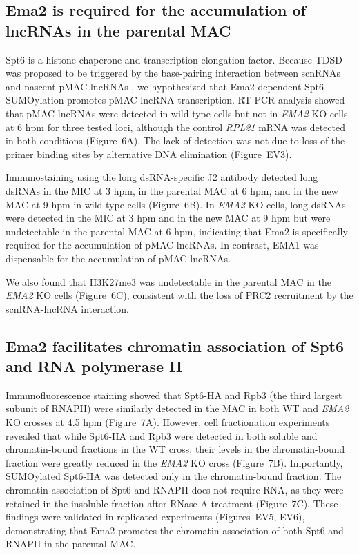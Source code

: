 \documentclass[11pt]{article}
\begin{document}
\subsection{Ema2 is required for the accumulation of lncRNAs in the parental MAC}

Spt6 is a histone chaperone and transcription elongation factor. Because TDSD was proposed to be triggered by the base-pairing interaction between scnRNAs and nascent pMAC-lncRNAs \citep{aronica2008study,noto2018}, we hypothesized that Ema2-dependent Spt6 SUMOylation promotes pMAC-lncRNA transcription. RT-PCR analysis showed that pMAC-lncRNAs were detected in wild-type cells but not in \textit{EMA2} KO cells at 6 hpm for three tested loci, although the control \textit{RPL21} mRNA was detected in both conditions (Figure~6A). The lack of detection was not due to loss of the primer binding sites by alternative DNA elimination (Figure~EV3).

Immunostaining using the long dsRNA-specific J2 antibody \citep{schoenborn1991} detected long dsRNAs in the MIC at 3 hpm, in the parental MAC at 6 hpm, and in the new MAC at 9 hpm in wild-type cells (Figure~6B). In \textit{EMA2} KO cells, long dsRNAs were detected in the MIC at 3 hpm and in the new MAC at 9 hpm but were undetectable in the parental MAC at 6 hpm, indicating that Ema2 is specifically required for the accumulation of pMAC-lncRNAs. In contrast, EMA1 was dispensable for the accumulation of pMAC-lncRNAs.

We also found that H3K27me3 was undetectable in the parental MAC in the \textit{EMA2} KO cells (Figure~6C), consistent with the loss of PRC2 recruitment by the scnRNA-lncRNA interaction.

\subsection{Ema2 facilitates chromatin association of Spt6 and RNA polymerase II}

Immunofluorescence staining showed that Spt6-HA and Rpb3 (the third largest subunit of RNAPII) were similarly detected in the MAC in both WT and \textit{EMA2} KO crosses at 4.5 hpm (Figure~7A). However, cell fractionation experiments revealed that while Spt6-HA and Rpb3 were detected in both soluble and chromatin-bound fractions in the WT cross, their levels in the chromatin-bound fraction were greatly reduced in the \textit{EMA2} KO cross (Figure~7B). Importantly, SUMOylated Spt6-HA was detected only in the chromatin-bound fraction. The chromatin association of Spt6 and RNAPII does not require RNA, as they were retained in the insoluble fraction after RNase A treatment (Figure~7C). These findings were validated in replicated experiments (Figures~EV5, EV6), demonstrating that Ema2 promotes the chromatin association of both Spt6 and RNAPII in the parental MAC.
\end{document}
